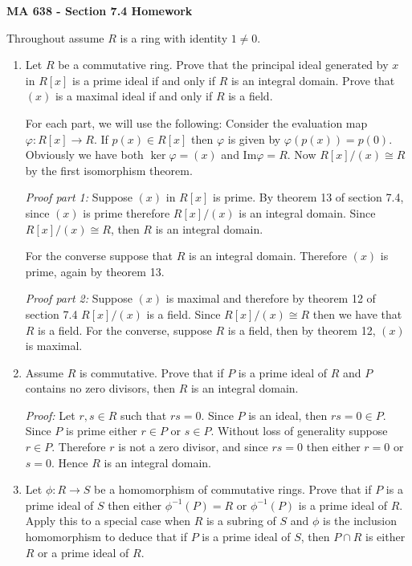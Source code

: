 \documentclass[11pt]{article}
\def\noin{\noindent}
\begin{document}
\thispagestyle{empty}
%
%


\large
\noin \textbf{MA 638 - Section 7.4 Homework}\\


\normalsize



Throughout assume $R$ is a ring with identity $1\ne 0$.

\begin{enumerate}


\item Let $R$ be a commutative ring.  Prove that the principal ideal generated by $x$ in $R[x]$ is a prime ideal if and only if $R$ is an integral domain.  Prove that $(x)$ is a maximal ideal if and only if $R$ is a field.

For each part, we will use the following:  Consider the evaluation map $\varphi: R[x]\to R$.  If $p(x)\in R[x]$ then $\varphi$ is given by $\varphi(p(x))=p(0)$. Obviously we have both $\ker \varphi = (x)$ and $\text{Im} \varphi = R$.  Now $R[x]/(x) \cong R$ by the first isomorphism theorem.

{\it Proof part 1:}  Suppose $(x)$ in $R[x]$ is prime.  By theorem 13 of section 7.4, since $(x)$ is prime therefore $R[x]/(x)$ is an integral domain.  Since $R[x]/(x)\cong R$, then $R$ is an integral domain.

For the converse suppose that $R$ is an integral domain.  Therefore $(x)$ is prime, again by theorem 13.

{\it Proof part 2:} Suppose $(x)$ is maximal and therefore by theorem 12 of section 7.4 $R[x]/(x)$ is a field.  Since $R[x]/(x)\cong R$ then we have that $R$ is a field.  For the converse, suppose $R$ is a field, then by theorem 12, $(x)$ is maximal.

\item Assume $R$ is commutative.  Prove that if $P$ is a prime ideal of $R$ and $P$ contains no zero divisors, then $R$ is an integral domain.

{\it Proof:} Let $r,s\in R$ such that $rs=0$.  Since $P$ is an ideal, then $rs=0\in P$.  Since $P$ is prime either $r\in P$ or $s\in P$.  Without loss of generality suppose $r\in P$.  Therefore $r$ is not a zero divisor, and since $rs=0$ then either $r=0$ or $s=0$.  Hence $R$ is an integral domain.

\item Let $\phi: R\to S$ be a homomorphism of commutative rings.  Prove that if $P$ is a prime ideal of $S$ then either $\phi^{-1}(P) = R$ or $\phi^{-1}(P)$ is a prime ideal of $R$.  Apply this to a special case when $R$ is a subring of $S$ and $\phi$ is the inclusion homomorphism to deduce that if $P$ is a prime ideal of $S$, then $P\cap R$ is either $R$ or a prime ideal of $R$.


\end{enumerate}
\end{document}
